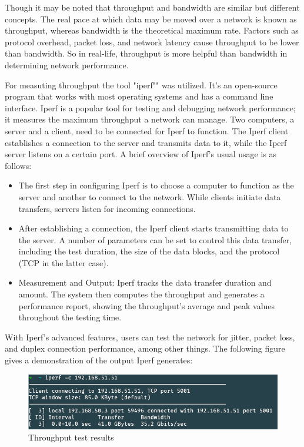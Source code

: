 \documentclass[12pt, fleqn, a4paper]{article}
\begin{document}
Though it may be noted that throughput and bandwidth are similar but different concepts. The real pace at which data may be moved over a network is known as throughput, whereas bandwidth is the theoretical maximum rate. Factors such as protocol overhead, packet loss, and network latency cause throughput to be lower than bandwidth. So in real-life, throughput is more helpful than bandwidth in determining network performance.

For measuting throughput the tool "iperf"" was utilized. 
It's an open-source program that works with most operating systems and has a command line interface. Iperf is a popular tool for testing and debugging network performance; it measures the maximum throughput a network can manage.
Two computers, a server and a client, need to be connected for Iperf to function. The Iperf client establishes a connection to the server and transmits data to it, while the Iperf server listens on a certain port. A brief overview of Iperf's usual usage is as follows:
\begin{itemize}
\item The first step in configuring Iperf is to choose a computer to function as the server and another to connect to the network. While clients initiate data transfers, servers listen for incoming connections.
\item After establishing a connection, the Iperf client starts transmitting data to the server. A number of parameters can be set to control this data transfer, including the test duration, the size of the data blocks, and the protocol (TCP in the latter case).
\item Measurement and Output: Iperf tracks the data transfer duration and amount. The system then computes the throughput and generates a performance report, showing the throughput's average and peak values throughout the testing time.
\end{itemize}
With Iperf's advanced features, users can test the network for jitter, packet loss, and duplex connection performance, among other things. 
The following figure gives a demonstration of the output Iperf generates:
\begin{figure}[H]
	\centering
	\includegraphics[width=1\textwidth]{img/iperf}
	\caption{Throughput test results}
  \label{fig:iperf}
\end{figure}
\end{document}
